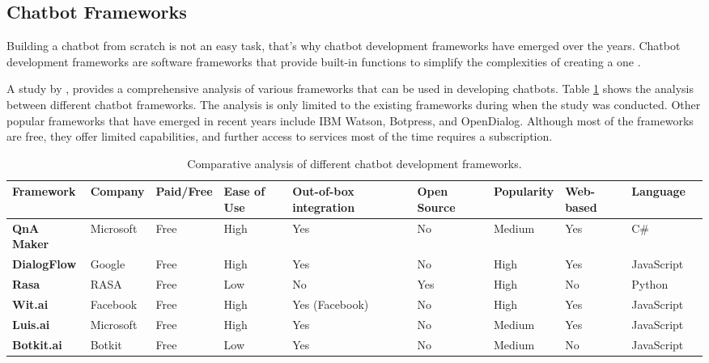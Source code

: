 \subsection{Chatbot Frameworks}

Building a chatbot from scratch is not an easy task, that’s why chatbot development frameworks have emerged over the years. Chatbot development frameworks are software frameworks that provide built-in functions to simplify the complexities of creating a one \cite{geekforgeeks2024}. 

A study by \cite{omaima2020}, provides a comprehensive analysis of various frameworks that can be used in developing chatbots. Table \ref{Tab: framework_comparison} shows the analysis between different chatbot frameworks. The analysis is only limited to the existing frameworks during when the study was conducted. Other popular frameworks that have emerged in recent years include IBM Watson, Botpress, and OpenDialog. Although most of the frameworks are free, they offer limited capabilities, and further access to services most of the time requires a subscription.

\newpage

\begin{table}
	\begin{adjustbox}{max width=\textwidth}
		\begin{tabular}{|p{2.6cm}|p{2.1cm}|p{2cm}|p{2.1cm}|p{2.4cm}|p{2cm}|p{2cm}|p{2cm}|p{2cm}|p{2.3cm}|}
		\hline
		\textbf{Framework} 
		& \textbf{Company} 
		& \textbf{Paid/Free} 
		& \textbf{Ease of Use} 
		& \textbf{Out-of-box integration} 
		& \textbf{Open Source} 
		& \textbf{Popularity} 
		& \textbf{Web-based} 
		& \textbf{Language} 
		\\ \hline
		\textbf{QnA Maker} 
		& Microsoft 
		& Free 
		& High 
		& Yes 
		& No 
		& Medium 
		& Yes 
		& C\# 
		\\ \hline
		\textbf{DialogFlow} 
		& Google 
		& Free 
		& High 
		& Yes 
		& No 
		& High 
		& Yes 
		& JavaScript 
		\\ \hline
		\textbf{Rasa} 
		& RASA 
		& Free 
		& Low 
		& No 
		& Yes 
		& High 
		& No 
		& Python 
		\\ \hline
		\textbf{Wit.ai} 
		& Facebook 
		& Free 
		& High 
		& Yes (Facebook) 
		& No 
		& High 
		& Yes 
		& JavaScript 
		\\
		\hline
		\textbf{Luis.ai} 
		& Microsoft 
		& Free 
		& High 
		& Yes 
		& No 
		& Medium 
		& Yes 
		& JavaScript 
		\\
		\hline
		\textbf{Botkit.ai} 
		& Botkit 
		& Free 
		& Low 
		& Yes 
		& No 
		& Medium 
		& No 
		& JavaScript 
		\\
		\hline
		\end{tabular}
	\end{adjustbox}
	\caption{Comparative analysis of different chatbot development frameworks.}
	\label{Tab: framework_comparison}
\end{table}

